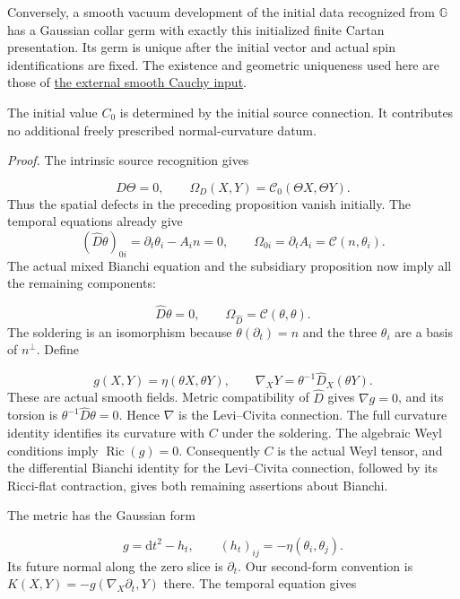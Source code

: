 \documentclass[
  english,
  11pt,
  reqno]{amsart}
\begin{document}
Conversely, a smooth vacuum development of the initial data recognized
from \(\mathbb G\) has a Gaussian collar germ with exactly this
initialized finite Cartan presentation. Its germ is unique after the
initial vector and actual spin identifications are fixed. The existence
and geometric uniqueness used here are those of
\hyperref[thm:online-smooth-local-cauchy-input]{the external smooth
Cauchy input}.

The initial value \(C_0\) is determined by the initial source
connection. It contributes no additional freely prescribed
normal-curvature datum.

\emph{Proof.} The intrinsic source recognition gives

\label{eq:online-cartan-initial-spatial-identities} \[
D\Theta=0,\qquad
\Omega_D(X,Y)=\mathcal C_0(\Theta X,\Theta Y).
\] Thus the spatial defects in the preceding proposition vanish
initially. The temporal equations already give \[
(\widehat D\theta)_{0i}
=\partial_t\theta_i-A_i n=0,
\qquad
\Omega_{0i}
=\partial_t A_i=\mathcal C(n,\theta_i).
\] The actual mixed Bianchi equation and the subsidiary proposition now
imply all the remaining components:

\label{eq:online-cartan-full-spacetime-identities} \[
\widehat D\theta=0,
\qquad
\Omega_{\widehat D}=\mathcal C(\theta,\theta).
\] The soldering is an isomorphism because \(\theta(\partial_t)=n\) and
the three \(\theta_i\) are a basis of \(n^\perp\). Define

\label{eq:online-cartan-reconstructed-metric-connection}
\[
g(X,Y)=\eta(\theta X,\theta Y),
\qquad
\nabla_XY=\theta^{-1}\widehat D_X(\theta Y).
\] These are actual smooth fields. Metric compatibility of
\(\widehat D\) gives \(\nabla g=0\), and its torsion is
\(\theta^{-1}\widehat D\theta=0\). Hence \(\nabla\) is the Levi--Civita
connection. The full curvature identity identifies its curvature with
\(C\) under the soldering. The algebraic Weyl conditions imply
\(\operatorname{Ric}(g)=0\). Consequently \(C\) is the actual Weyl
tensor, and the differential Bianchi identity for the Levi--Civita
connection, followed by its Ricci-flat contraction, gives both remaining
assertions about Bianchi.

The metric has the Gaussian form

\label{eq:online-cartan-gaussian-metric} \[
g=\mathrm dt^2-h_t,
\qquad
(h_t)_{ij}=-\eta(\theta_i,\theta_j).
\] Its future normal along the zero slice is \(\partial_t\). Our
second-form convention is \(K(X,Y)=-g(\nabla_X\partial_t,Y)\) there. The
temporal equation gives
\end{document}
